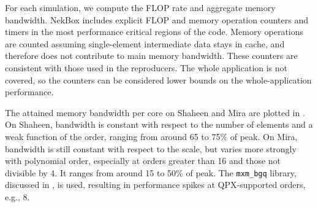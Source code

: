 For each simulation, we compute the FLOP rate and aggregate memory bandwidth.
NekBox includes explicit FLOP and memory operation counters and timers in the most performance critical regions of the code.
Memory operations are counted assuming single-element intermediate data stays in cache, and therefore does not contribute to main memory bandwidth.
These counters are consistent with those used in the reproducers.
The whole application is not covered, so the counters can be considered lower bounds on the whole-application performance.

The attained memory bandwidth per core on Shaheen and Mira are plotted in .
On Shaheen, bandwidth is constant with respect to the number of elements and a weak function of the order, ranging from around 65 to 75\% of peak.
On Mira, bandwidth is still constant with respect to the scale, but varies more strongly with polynomial order, especially at orders greater than 16 and those not divisible by 4.
It ranges from around 15 to 50\% of peak.
The \texttt{mxm\_bgq} library, discussed in , is used, resulting in performance spikes at QPX-supported orders, e.g., 8.

